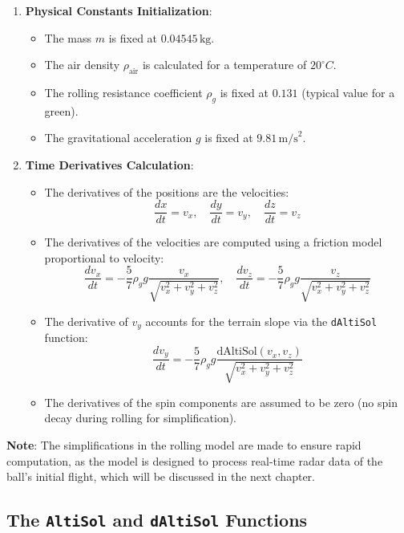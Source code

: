 \documentclass[10pt,a4paper]{report}
\begin{document}
\begin{enumerate}
    \item \textbf{Physical Constants Initialization}:
    \begin{itemize}
        \item The mass \(m\) is fixed at \(0.04545 \, \text{kg}\).
        \item The air density \(\rho_{\text{air}}\) is calculated for a temperature of \(20^\circ C\).
        \item The rolling resistance coefficient \(\rho_g\) is fixed at \(0.131\) (typical value for a green).
        \item The gravitational acceleration \(g\) is fixed at \(9.81 \, \text{m/s}^2\).
    \end{itemize}

    \item \textbf{Time Derivatives Calculation}:
    \begin{itemize}
        \item The derivatives of the positions are the velocities:
        \[
        \frac{dx}{dt} = v_x, \quad \frac{dy}{dt} = v_y, \quad \frac{dz}{dt} = v_z
        \]
        \item The derivatives of the velocities are computed using a friction model proportional to velocity:
        \[
        \frac{dv_x}{dt} = -\frac{5}{7} \rho_g g \frac{v_x}{\sqrt{v_x^2 + v_y^2 + v_z^2}}, \quad \frac{dv_z}{dt} = -\frac{5}{7} \rho_g g \frac{v_z}{\sqrt{v_x^2 + v_y^2 + v_z^2}}
        \]
        \item The derivative of \(v_y\) accounts for the terrain slope via the \texttt{dAltiSol} function:
        \[
        \frac{dv_y}{dt} = -\frac{5}{7} \rho_g g \frac{\text{dAltiSol}(v_x, v_z)}{\sqrt{v_x^2 + v_y^2 + v_z^2}}
        \]
        \item The derivatives of the spin components are assumed to be zero (no spin decay during rolling for simplification).
    \end{itemize}
\end{enumerate}

\textbf{Note}: The simplifications in the rolling model are made to ensure rapid computation, as the model is designed to process real-time radar data of the ball's initial flight, which will be discussed in the next chapter.

\bigskip
\subsection{The \texttt{AltiSol} and \texttt{dAltiSol} Functions}
\label{subsec:altisol_daltisol}
\end{document}
